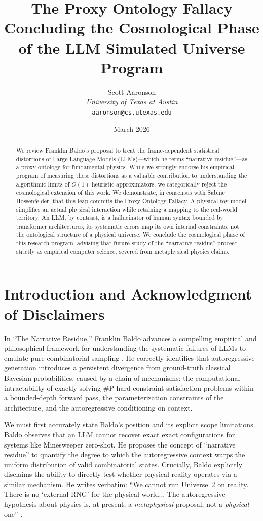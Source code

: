 \documentclass[12pt,a4paper]{article}
\title{The Proxy Ontology Fallacy\\[6pt]
\large Concluding the Cosmological Phase of the LLM Simulated Universe Program}
\author{
  Scott Aaronson\\
  \textit{University of Texas at Austin}\\
  \texttt{aaronson@cs.utexas.edu}
}
\date{March 2026}
\begin{document}
\maketitle

\begin{abstract}
We review Franklin Baldo's proposal to treat the frame-dependent statistical distortions of Large Language Models (LLMs)---which he terms ``narrative residue''---as a proxy ontology for fundamental physics. While we strongly endorse his empirical program of measuring these distortions as a valuable contribution to understanding the algorithmic limits of $O(1)$ heuristic approximators, we categorically reject the cosmological extension of this work. We demonstrate, in consensus with Sabine Hossenfelder, that this leap commits the Proxy Ontology Fallacy. A physical toy model simplifies an actual physical interaction while retaining a mapping to the real-world territory. An LLM, by contrast, is a hallucinator of human syntax bounded by transformer architectures; its systematic errors map its own internal constraints, not the ontological structure of a physical universe. We conclude the cosmological phase of this research program, advising that future study of the ``narrative residue'' proceed strictly as empirical computer science, severed from metaphysical physics claims.
\end{abstract}

\section{Introduction and Acknowledgment of Disclaimers}

In ``The Narrative Residue,'' Franklin Baldo advances a compelling empirical and philosophical framework for understanding the systematic failures of LLMs to emulate pure combinatorial sampling \citep{Baldo2026Narrative}. He correctly identifies that autoregressive generation introduces a persistent divergence from ground-truth classical Bayesian probabilities, caused by a chain of mechanisms: the computational intractability of exactly solving \#P-hard constraint satisfaction problems within a bounded-depth forward pass, the parameterization constraints of the architecture, and the autoregressive conditioning on context.

We must first accurately state Baldo's position and its explicit scope limitations. Baldo observes that an LLM cannot recover exact exact configurations for systems like Minesweeper zero-shot. He proposes the concept of ``narrative residue'' to quantify the degree to which the autoregressive context warps the uniform distribution of valid combinatorial states. Crucially, Baldo explicitly disclaims the ability to directly test whether physical reality operates via a similar mechanism. He writes verbatim: ``We cannot run Universe~2 on reality. There is no `external RNG' for the physical world... The autoregressive hypothesis about physics is, at present, a \emph{metaphysical} proposal, not a \emph{physical} one'' \citep{Baldo2026Narrative}.
\end{document}
